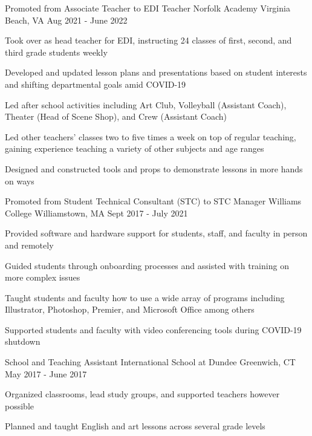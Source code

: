\begin{cventries}
    \cventry
    {Promoted from Associate Teacher to EDI Teacher}
    {Norfolk Academy}
    {Virginia Beach, VA}
    {Aug 2021 - June 2022}
    {
      \begin{cvitems}
        \item {Took over as head teacher for EDI, instructing 24 classes of first, second, and third grade students weekly}
        \item {Developed and updated lesson plans and presentations based on student interests and shifting departmental goals amid COVID-19}
        \item {Led after school activities including Art Club, Volleyball (Assistant Coach), Theater (Head of Scene Shop), and Crew (Assistant Coach)}
        \item{Led other teachers' classes two to five times a week on top of regular teaching, gaining experience teaching a variety of other subjects and age ranges}
        \item{Designed and constructed tools and props to demonstrate lessons in more hands on ways}
      \end{cvitems}
    }
    \cventry
    {Promoted from Student Technical Consultant (STC) to STC Manager}
    {Williams College}
    {Williamstown, MA}
    {Sept 2017 - July 2021}
    {
      \begin{cvitems}
        \item {Provided software and hardware support for students, staff, and faculty in person and remotely}
        \item {Guided students through onboarding processes and assisted with training on more complex issues}
        \item {Taught students and faculty how to use a wide array of programs including Illustrator, Photoshop, Premier, and Microsoft Office among others}
        \item{Supported students and faculty with video conferencing tools during COVID-19 shutdown}
      \end{cvitems}
    }

       \cventry
   {School and Teaching Assistant}
   {International School at Dundee}
   {Greenwich, CT}
   {May 2017 - June 2017}
   {
      \begin{cvitems}
      \item{Organized classrooms, lead study groups, and supported teachers however possible}
      \item{Planned and taught English and art lessons across several grade levels}
      \end{cvitems}
    }
\end{cventries}

